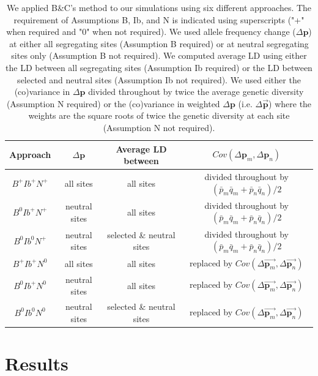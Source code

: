 \documentclass[12pt]{article}
\begin{document}
\begin{bibunit}
\begin{table}[H]
    \centering
    \begin{tabular}{|c|c|c|c|}
    \hline
        Approach & $\Delta\textbf{p}$ & Average LD between &  $Cov(\Delta\textbf{p}_m,\Delta\textbf{p}_n)$  \\
         \hline
         $B^+Ib^+N^+$&all sites&all sites&divided throughout by ${(\bar{p}_m\bar{q}_m + \bar{p}_n\bar{q}_n )/2}$\\
         $B^0Ib^+N^+$&neutral sites&all sites&divided throughout by ${(\bar{p}_m\bar{q}_m + \bar{p}_n\bar{q}_n )/2}$\\
         $B^0Ib^0N^+$&neutral sites&selected \& neutral sites&divided throughout by ${(\bar{p}_m\bar{q}_m + \bar{p}_n\bar{q}_n )/2}$\\
         $B^+Ib^+N^0$&all sites&all sites&replaced by $Cov(\Delta\overrightarrow{\textbf{p}_m},\Delta\overrightarrow{\textbf{p}_n})$\\
         $B^0Ib^+N^0$&neutral sites&all sites&replaced by $Cov(\Delta\overrightarrow{\textbf{p}_m},\Delta\overrightarrow{\textbf{p}_n})$\\
         $B^0Ib^0N^0$&neutral sites&selected \& neutral sites&replaced by $Cov(\Delta\overrightarrow{\textbf{p}_m},\Delta\overrightarrow{\textbf{p}_n})$\\
         \hline
    \end{tabular}
    \caption{We applied B\&C's method to our simulations using six different approaches. The requirement of Assumptions B, Ib, and N is indicated using superscripts ("+" when required and "0" when not required). We used allele frequency change ($\Delta\textbf{p}$) at either all segregating sites (Assumption B required) or at neutral segregating sites only (Assumption B not required). We computed average LD using either the LD between all segregating sites (Assumption Ib required) or the LD between selected and neutral sites (Assumption Ib not required). We used either the (co)variance in $\Delta\textbf{p}$ divided throughout by twice the average genetic diversity (Assumption N required) or the (co)variance in weighted $\Delta\textbf{p}$ (i.e. $\Delta\overrightarrow{\textbf{p}}$) where the weights are the square roots of twice the genetic diversity at each site (Assumption N not required).}
    \label{tab:BC_approaches}
\end{table}


\section*{Results}

\end{bibunit}
\end{document}
